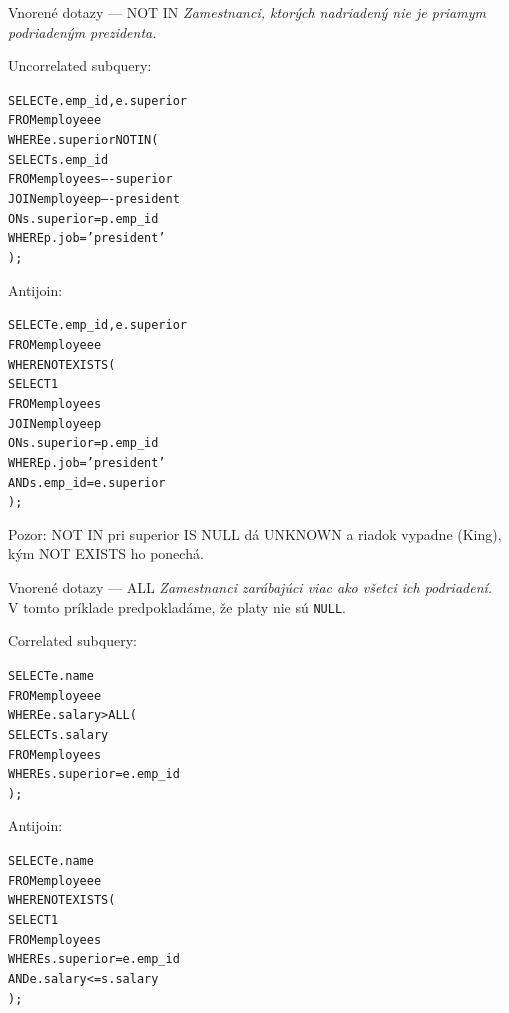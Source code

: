\documentclass[12pt]{beamer}
\def\blue#1{\textcolor{Cerulean}{#1}}
\begin{document}
\begin{frame}[fragile]{Vnorené dotazy --- NOT IN}
\footnotesize
\emph{Zamestnanci, ktorých nadriadený nie je priamym podriadeným prezidenta.}\\[7mm]
\begin{minipage}{.4\pdfpagewidth}
\alert{Un}correlated subquery:
\footnotesize
\begin{alltt}
SELECT e.emp_id, e.superior
FROM employee e
WHERE \blue{e.superior NOT IN} (
  SELECT \blue{s.emp_id}
  FROM employee s ----superior
  JOIN employee p ----president
    ON s.superior = p.emp_id
  WHERE p.job = 'president'
);

\end{alltt}
\end{minipage}
\hfill\vline\hfill
\begin{minipage}{.4\pdfpagewidth}
Antijoin:
\footnotesize
\begin{alltt}
SELECT e.emp_id, e.superior
FROM employee e
WHERE \blue{NOT EXISTS} (
  SELECT 1
  FROM employee s
  JOIN employee p
    ON s.superior = p.emp_id
  WHERE p.job = 'president'
    \blue{AND s.emp_id = e.superior}
);
\end{alltt}
\end{minipage}
\medskip

\alert{Pozor:} NOT IN pri superior IS NULL dá UNKNOWN a riadok vypadne (King), kým NOT EXISTS ho ponechá.
\end{frame}

\begin{frame}[fragile]{Vnorené dotazy --- ALL}
\footnotesize
\emph{Zamestnanci zarábajúci viac ako všetci ich podriadení.}\\[2mm]
V tomto príklade predpokladáme, že platy nie sú \texttt{NULL}.\\[3mm]
\begin{minipage}{.4\pdfpagewidth}
Correlated subquery:
\footnotesize
\begin{alltt}
SELECT e.name
FROM employee e
WHERE e.salary > \blue{ALL} (
  SELECT s.salary
  FROM employee s
  WHERE s.superior = e.emp_id
);

\end{alltt}
\end{minipage}
\hfill\vline\hfill
\begin{minipage}{.4\pdfpagewidth}
Antijoin:
\footnotesize
\begin{alltt}
SELECT e.name
FROM employee e
WHERE NOT EXISTS (
  SELECT 1
  FROM employee s
  WHERE s.superior = e.emp_id
  AND e.salary <= s.salary
);
\end{alltt}
\end{minipage}
\end{frame}
\end{document}
